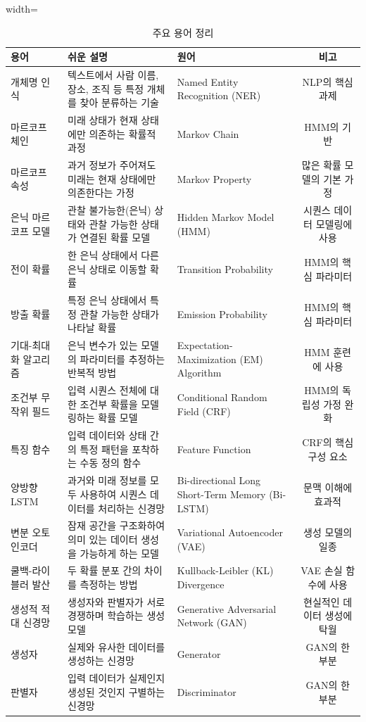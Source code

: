 \documentclass[11pt,a4paper]{article}
\theoremstyle{definition}
\begin{document}
\begin{table}[h!]
\centering
\caption{주요 용어 정리}
\label{tab:glossary}
\begin{adjustbox}{width=\textwidth}
\begin{tabular}{lllc}
\toprule
\textbf{용어} & \textbf{쉬운 설명} & \textbf{원어} & \textbf{비고} \\
\midrule
개체명 인식 & 텍스트에서 사람 이름, 장소, 조직 등 특정 개체를 찾아 분류하는 기술 & Named Entity Recognition (NER) & NLP의 핵심 과제 \\
마르코프 체인 & 미래 상태가 현재 상태에만 의존하는 확률적 과정 & Markov Chain & HMM의 기반 \\
마르코프 속성 & 과거 정보가 주어져도 미래는 현재 상태에만 의존한다는 가정 & Markov Property & 많은 확률 모델의 기본 가정 \\
은닉 마르코프 모델 & 관찰 불가능한(은닉) 상태와 관찰 가능한 상태가 연결된 확률 모델 & Hidden Markov Model (HMM) & 시퀀스 데이터 모델링에 사용 \\
전이 확률 & 한 은닉 상태에서 다른 은닉 상태로 이동할 확률 & Transition Probability & HMM의 핵심 파라미터 \\
방출 확률 & 특정 은닉 상태에서 특정 관찰 가능한 상태가 나타날 확률 & Emission Probability & HMM의 핵심 파라미터 \\
기대-최대화 알고리즘 & 은닉 변수가 있는 모델의 파라미터를 추정하는 반복적 방법 & Expectation-Maximization (EM) Algorithm & HMM 훈련에 사용 \\
조건부 무작위 필드 & 입력 시퀀스 전체에 대한 조건부 확률을 모델링하는 확률 모델 & Conditional Random Field (CRF) & HMM의 독립성 가정 완화 \\
특징 함수 & 입력 데이터와 상태 간의 특정 패턴을 포착하는 수동 정의 함수 & Feature Function & CRF의 핵심 구성 요소 \\
양방향 LSTM & 과거와 미래 정보를 모두 사용하여 시퀀스 데이터를 처리하는 신경망 & Bi-directional Long Short-Term Memory (Bi-LSTM) & 문맥 이해에 효과적 \\
변분 오토인코더 & 잠재 공간을 구조화하여 의미 있는 데이터 생성을 가능하게 하는 모델 & Variational Autoencoder (VAE) & 생성 모델의 일종 \\
쿨백-라이블러 발산 & 두 확률 분포 간의 차이를 측정하는 방법 & Kullback-Leibler (KL) Divergence & VAE 손실 함수에 사용 \\
생성적 적대 신경망 & 생성자와 판별자가 서로 경쟁하며 학습하는 생성 모델 & Generative Adversarial Network (GAN) & 현실적인 데이터 생성에 탁월 \\
생성자 & 실제와 유사한 데이터를 생성하는 신경망 & Generator & GAN의 한 부분 \\
판별자 & 입력 데이터가 실제인지 생성된 것인지 구별하는 신경망 & Discriminator & GAN의 한 부분 \\
\bottomrule
\end{tabular}
\end{adjustbox}
\end{table}
\end{document}
